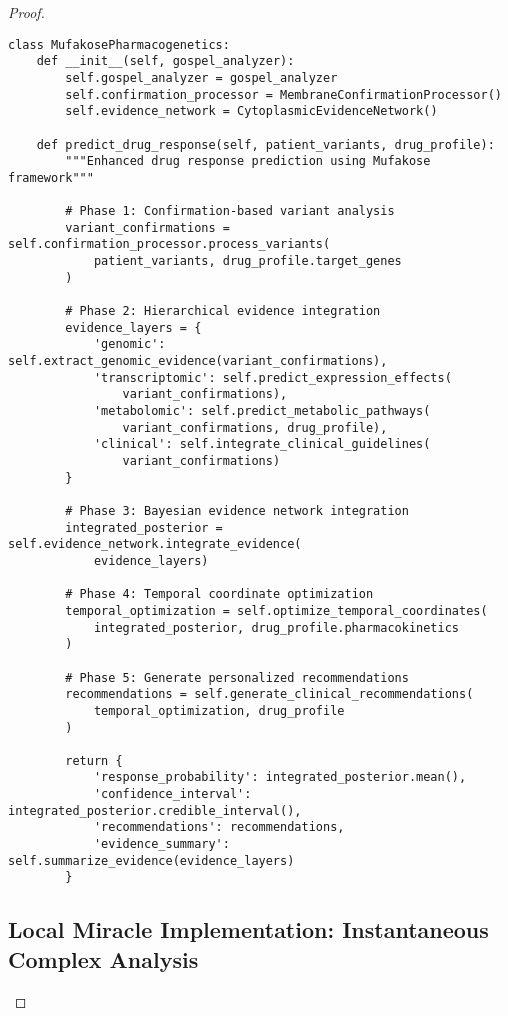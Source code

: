 \documentclass[12pt,a4paper]{article}
\begin{document}
\begin{proof}
\begin{lstlisting}[style=pythonstyle, caption=Mufakose-Enhanced Pharmacogenetic Analysis]
class MufakosePharmacogenetics:
    def __init__(self, gospel_analyzer):
        self.gospel_analyzer = gospel_analyzer
        self.confirmation_processor = MembraneConfirmationProcessor()
        self.evidence_network = CytoplasmicEvidenceNetwork()
    
    def predict_drug_response(self, patient_variants, drug_profile):
        """Enhanced drug response prediction using Mufakose framework"""
        
        # Phase 1: Confirmation-based variant analysis
        variant_confirmations = self.confirmation_processor.process_variants(
            patient_variants, drug_profile.target_genes
        )
        
        # Phase 2: Hierarchical evidence integration
        evidence_layers = {
            'genomic': self.extract_genomic_evidence(variant_confirmations),
            'transcriptomic': self.predict_expression_effects(
                variant_confirmations),
            'metabolomic': self.predict_metabolic_pathways(
                variant_confirmations, drug_profile),
            'clinical': self.integrate_clinical_guidelines(
                variant_confirmations)
        }
        
        # Phase 3: Bayesian evidence network integration
        integrated_posterior = self.evidence_network.integrate_evidence(
            evidence_layers)
        
        # Phase 4: Temporal coordinate optimization
        temporal_optimization = self.optimize_temporal_coordinates(
            integrated_posterior, drug_profile.pharmacokinetics
        )
        
        # Phase 5: Generate personalized recommendations
        recommendations = self.generate_clinical_recommendations(
            temporal_optimization, drug_profile
        )
        
        return {
            'response_probability': integrated_posterior.mean(),
            'confidence_interval': integrated_posterior.credible_interval(),
            'recommendations': recommendations,
            'evidence_summary': self.summarize_evidence(evidence_layers)
        }
\end{lstlisting}

\subsection{Local Miracle Implementation: Instantaneous Complex Analysis}


\end{proof}
\end{document}
